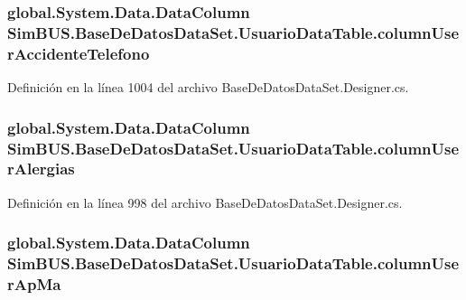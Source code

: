 \subsubsection[{column\-User\-Accidente\-Telefono}]{\setlength{\rightskip}{0pt plus 5cm}global.\-System.\-Data.\-Data\-Column Sim\-B\-U\-S.\-Base\-De\-Datos\-Data\-Set.\-Usuario\-Data\-Table.\-column\-User\-Accidente\-Telefono\hspace{0.3cm}{\ttfamily [private]}}\label{class_sim_b_u_s_1_1_base_de_datos_data_set_1_1_usuario_data_table_afac4eb7735f9ee2305cdc19f3a12e1bd}


Definición en la línea 1004 del archivo Base\-De\-Datos\-Data\-Set.\-Designer.\-cs.

\subsubsection[{column\-User\-Alergias}]{\setlength{\rightskip}{0pt plus 5cm}global.\-System.\-Data.\-Data\-Column Sim\-B\-U\-S.\-Base\-De\-Datos\-Data\-Set.\-Usuario\-Data\-Table.\-column\-User\-Alergias\hspace{0.3cm}{\ttfamily [private]}}\label{class_sim_b_u_s_1_1_base_de_datos_data_set_1_1_usuario_data_table_a4f89be1a3c8f26208c5f6f4d1f9a3582}


Definición en la línea 998 del archivo Base\-De\-Datos\-Data\-Set.\-Designer.\-cs.

\subsubsection[{column\-User\-Ap\-Ma}]{\setlength{\rightskip}{0pt plus 5cm}global.\-System.\-Data.\-Data\-Column Sim\-B\-U\-S.\-Base\-De\-Datos\-Data\-Set.\-Usuario\-Data\-Table.\-column\-User\-Ap\-Ma\hspace{0.3cm}{\ttfamily [private]}}\label{class_sim_b_u_s_1_1_base_de_datos_data_set_1_1_usuario_data_table_a99d4a6d8d43961af5baf9ab7d5911811}


